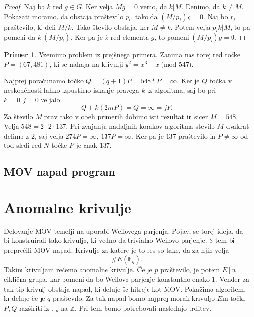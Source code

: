 \documentclass[12pt,a4paper,twoside]{article}
\theoremstyle{definition} %
\newtheorem{primer}[definicija]{Primer}
\theoremstyle{plain} %
\numberwithin{equation}{section}  %
\newcommand{\Z}{\mathbb Z}
\newcommand{\F}{\mathbb F}
\newcommand{\E}[1]{E({#1})}
\newcommand{\MOD}[1]{\ \text{(mod }{#1}\text{)}}
\begin{document}
\begin{proof}

Naj bo $k$ red $g\in G$. Ker velja $Mg = 0$ vemo, da $k|M$. Denimo, da $k \neq M$. Pokazati moramo, da obstaja praštevilo $p_i$, tako da $(M/p_i)g = 0$. Naj bo $p_i$ praštevilo, ki deli $M/k$. Tako število obstaja, ker $M \neq k$. Potem velja $p_ik|M$, to pa pomeni da $k|(M/p_i)$. Ker pa je $k$ red elementa $g$, to pomeni $(M/p_i)g = 0$.

\end{proof}


\begin{primer}

Vzemimo problem iz prejšnega primera. Zanima nas torej red točke $P=(67,481)$, ki se nahaja na krivulji $y^2 = x^3+x \MOD{547}$.

Najprej poračunamo točko $Q = (q+1)P = 548*P = \infty$. Ker je $Q$ točka v neskončnosti lahko izpustimo iskanje pravega $k$ iz algoritma, saj bo pri $k=0,j=0$ veljalo
$$Q+k(2mP) = Q =  \infty = jP.$$
Za število $M$ prav tako v obeh primerih dobimo isti rezultat in sicer $M = 548$. Velja $548=2\cdot 2\cdot 137$. Pri zvajanju nadaljnih korakov algoritma stevilo $M$ dvakrat delimo z $2$, saj velja $274P = \infty, \ 137P = \infty$. Ker pa je $137$ praštevilo in $P \neq \infty$ od tod sledi red $N$ točke $P$ je enak $137$.

\end{primer}


\subsection{MOV napad program}




\section{Anomalne krivulje}

Delovanje MOV temelji na uporabi Weilovega parjenja. Pojavi se torej ideja, da bi konstruirali tako krivuljo, ki vedno da trivialno Weilovo parjenje. S tem bi preprečili MOV napad. Krivulje za katere je to res so take, da za njih velja
$$\#\E{\F_q}.$$
Takim krivuljam rečemo anomalne krivulje. Če je $p$ praštevilo, je potem $E[n]$ ciklična grupa, kar pomeni da bo Weilovo parjenje konstantno enako $1$. Vender za tak tip krivulj obstaja napad, ki deluje še hitreje kot MOV.
Pokažimo algoritem, ki deluje če je $q$ praštevilo.
Za tak napad bomo najprej morali krivuljo $E$in točki $P,Q$ razširiti iz $\F_p$ na $\Z$. Pri tem bomo potrebovali naslednjo trditev.
\end{document}
